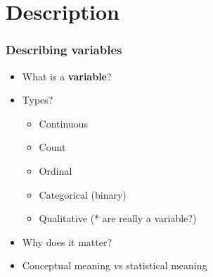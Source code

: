\documentclass[aspectratio=43]{beamer}
\begin{document}
%
%

\section{Description}

\begin{frame}
\frametitle{Describing variables}
\centering

\begin{itemize}
  \item What is a \textbf{variable}?
  \item Types?
  \begin{itemize}
    \item<2-> Continuous
    \item<3-> Count
    \item<4-> Ordinal
    \item<5-> Categorical (binary)
    \item<6-> Qualitative (* are really a variable?)
  \end{itemize}
  \item<7-> Why does it matter?
  \item<7-> Conceptual meaning vs statistical meaning
\end{itemize}

\end{frame}
\end{document}
